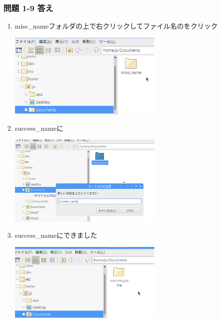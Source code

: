 \clearpage\subsubsection{\bfseries 問題 1-9 答え}


\begin{enumerate}
  \item
        miss\_nameフォルダの上で右クリックしてファイル名のをクリック

        \centering
        \includegraphics[width=0.6\textwidth]{text01-img/textbook-img214.png}
        \flushleft

  \item success\_nameに

        \centering
        \includegraphics[width=0.6\textwidth]{text01-img/textbook-img215.png}
        \flushleft
  \item success\_nameにできました

        \centering
        \includegraphics[width=0.6\textwidth]{text01-img/textbook-img216.png}
        \flushleft
\end{enumerate}

